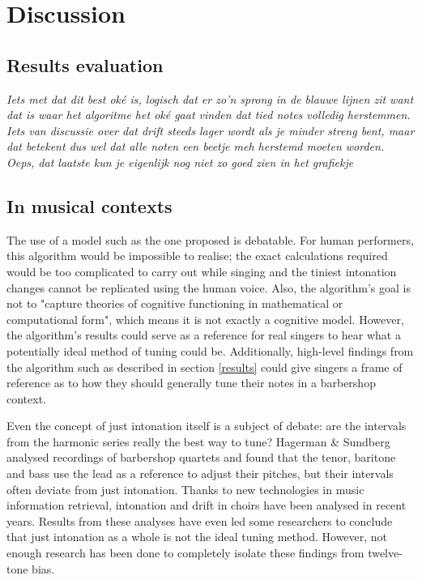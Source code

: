 \documentclass[a4paper]{article}
\begin{document}
\section{Discussion}
\label{discussion}
\subsection{Results evaluation}
\textit{\color{red}Iets met dat dit best oké is, logisch dat er zo'n sprong in de blauwe lijnen zit want dat is waar het algoritme het oké gaat vinden dat tied notes volledig herstemmen. Iets van discussie over dat drift steeds lager wordt als je minder streng bent, maar dat betekent dus wel dat alle noten een beetje meh herstemd moeten worden. Oeps, dat laatste kun je eigenlijk nog niet zo goed zien in het grafiekje}

\subsection{In musical contexts}
The use of a model such as the one proposed is debatable. For human performers, this algorithm would be impossible to realise; the exact calculations required would be too complicated to carry out while singing and the tiniest intonation changes cannot be replicated using the human voice. Also, the algorithm's goal is not to "capture theories of cognitive functioning in mathematical or computational form", which means it is not exactly a cognitive model.\cite{van_maanen_interpretation_2021} However, the algorithm's results could serve as a reference for real singers to hear what a potentially ideal method of tuning could be. Additionally, high-level findings from the algorithm such as described in section \ref{results} could give singers a frame of reference as to how they should generally tune their notes in a barbershop context.

Even the concept of just intonation itself is a subject of debate: are the intervals from the harmonic series really the best way to tune? Hagerman \& Sundberg analysed recordings of barbershop quartets and found that the tenor, baritone and bass use the lead as a reference to adjust their pitches, but their intervals often deviate from just intonation.\cite{hagerman_fundamental_1980} Thanks to new technologies in music information retrieval, intonation and drift in choirs have been analysed in recent years.\cite{devaney_study_2012, mauch_intonation_2014, dai_intonation_2019} Results from these analyses have even led some researchers to conclude that just intonation as a whole is not the ideal tuning method.\cite{parncutt_psychocultural_2018} However, not enough research has been done to completely isolate these findings from twelve-tone bias.
\end{document}
